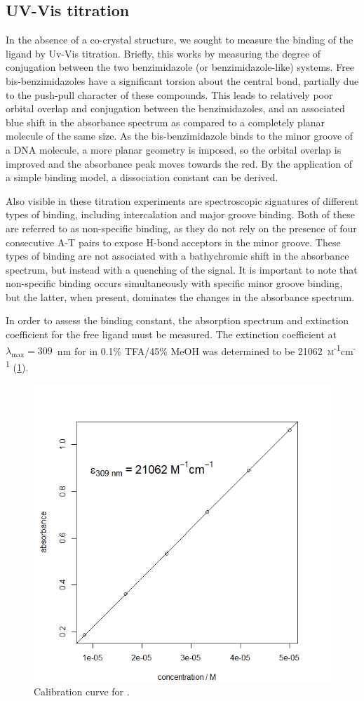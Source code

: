 \begin{refsection}
\subsection{UV-Vis titration}\label{sec:absorbance}
In the absence of a co-crystal structure, we sought to measure the binding of the ligand by Uv-Vis titration.
Briefly, this works by measuring the degree of conjugation between the two benzimidazole (or benzimidazole-like) systems.
Free bis-benzimidazoles have a significant torsion about the central bond, partially due to the push-pull character of these compounds.
This leads to relatively poor orbital overlap and conjugation between the benzimidazoles, and an associated blue shift in the absorbance spectrum as compared to a completely planar molecule of the same size.
As the bis-benzimidazole binds to the minor groove of a DNA molecule, a more planar geometry is imposed, so the orbital overlap is improved and the absorbance peak moves towards the red.
By the application of a simple binding model, a dissociation constant can be derived.

Also visible in these titration experiments are spectroscopic signatures of different types of binding, including intercalation and major groove binding.
Both of these are referred to as non-specific binding, as they do not rely on the presence of four consecutive A-T pairs to expose H-bond acceptors in the minor groove.
These types of binding are not associated with a bathychromic shift in the absorbance spectrum, but instead with a quenching of the signal.
It is important to note that non-specific binding occurs simultaneously with specific minor groove binding, but the latter, when present, dominates the changes in the absorbance spectrum.

In order to assess the binding constant, the absorption spectrum and extinction coefficient for the free ligand must be measured.
The extinction coefficient at $\lambda_{\text{max}} = 309$~nm for  in 0.1\% TFA/45\% MeOH was determined to be 21062~\textsc{m}\textsuperscript{-1}cm\textsuperscript{-1} (\cref{fig:ebs-rhs-ph-calcurve}).

\begin{figure}
    \includegraphics[width=0.5\linewidth]{Figures/ebshoe-calibration.png}
    \caption{Calibration curve for .}\label{fig:ebs-rhs-ph-calcurve}
\end{figure}


\end{refsection}
